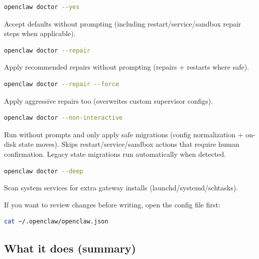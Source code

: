\begin{lstlisting}[language=bash]
openclaw doctor --yes
\end{lstlisting}


Accept defaults without prompting (including restart/service/sandbox repair steps when applicable).

\begin{lstlisting}[language=bash]
openclaw doctor --repair
\end{lstlisting}


Apply recommended repairs without prompting (repairs + restarts where safe).

\begin{lstlisting}[language=bash]
openclaw doctor --repair --force
\end{lstlisting}


Apply aggressive repairs too (overwrites custom supervisor configs).

\begin{lstlisting}[language=bash]
openclaw doctor --non-interactive
\end{lstlisting}


Run without prompts and only apply safe migrations (config normalization + on-disk state moves). Skips restart/service/sandbox actions that require human confirmation.
Legacy state migrations run automatically when detected.

\begin{lstlisting}[language=bash]
openclaw doctor --deep
\end{lstlisting}


Scan system services for extra gateway installs (launchd/systemd/schtasks).

If you want to review changes before writing, open the config file first:

\begin{lstlisting}[language=bash]
cat ~/.openclaw/openclaw.json
\end{lstlisting}


\subsection{What it does (summary)}


